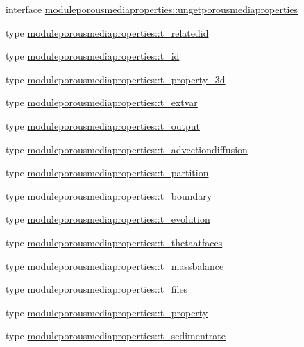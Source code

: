 \begin{DoxyCompactItemize}
\item 
interface \mbox{\hyperlink{interfacemoduleporousmediaproperties_1_1ungetporousmediaproperties}{moduleporousmediaproperties\+::ungetporousmediaproperties}}
\item 
type \mbox{\hyperlink{structmoduleporousmediaproperties_1_1t__relatedid}{moduleporousmediaproperties\+::t\+\_\+relatedid}}
\item 
type \mbox{\hyperlink{structmoduleporousmediaproperties_1_1t__id}{moduleporousmediaproperties\+::t\+\_\+id}}
\item 
type \mbox{\hyperlink{structmoduleporousmediaproperties_1_1t__property__3d}{moduleporousmediaproperties\+::t\+\_\+property\+\_\+3d}}
\item 
type \mbox{\hyperlink{structmoduleporousmediaproperties_1_1t__extvar}{moduleporousmediaproperties\+::t\+\_\+extvar}}
\item 
type \mbox{\hyperlink{structmoduleporousmediaproperties_1_1t__output}{moduleporousmediaproperties\+::t\+\_\+output}}
\item 
type \mbox{\hyperlink{structmoduleporousmediaproperties_1_1t__advectiondiffusion}{moduleporousmediaproperties\+::t\+\_\+advectiondiffusion}}
\item 
type \mbox{\hyperlink{structmoduleporousmediaproperties_1_1t__partition}{moduleporousmediaproperties\+::t\+\_\+partition}}
\item 
type \mbox{\hyperlink{structmoduleporousmediaproperties_1_1t__boundary}{moduleporousmediaproperties\+::t\+\_\+boundary}}
\item 
type \mbox{\hyperlink{structmoduleporousmediaproperties_1_1t__evolution}{moduleporousmediaproperties\+::t\+\_\+evolution}}
\item 
type \mbox{\hyperlink{structmoduleporousmediaproperties_1_1t__thetaatfaces}{moduleporousmediaproperties\+::t\+\_\+thetaatfaces}}
\item 
type \mbox{\hyperlink{structmoduleporousmediaproperties_1_1t__massbalance}{moduleporousmediaproperties\+::t\+\_\+massbalance}}
\item 
type \mbox{\hyperlink{structmoduleporousmediaproperties_1_1t__files}{moduleporousmediaproperties\+::t\+\_\+files}}
\item 
type \mbox{\hyperlink{structmoduleporousmediaproperties_1_1t__property}{moduleporousmediaproperties\+::t\+\_\+property}}
\item 
type \mbox{\hyperlink{structmoduleporousmediaproperties_1_1t__sedimentrate}{moduleporousmediaproperties\+::t\+\_\+sedimentrate}}

\end{DoxyCompactItemize}
